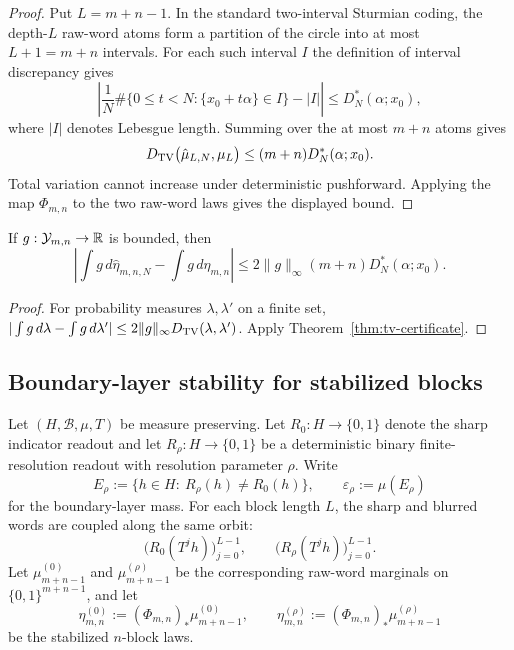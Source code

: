 \begin{proof}
Put $L=m+n-1$.  In the standard two-interval Sturmian coding, the depth-$L$
raw-word atoms form a partition of the circle into at most $L+1=m+n$
intervals.  For each such interval $I$ the definition of interval discrepancy
gives
\[
\left|
\frac1N\#\{0\le t<N:\{x_0+t\alpha\}\in I\}-|I|
\right|
\le D_N^*(\alpha;x_0),
\]
where $|I|$ denotes Lebesgue length.  Summing over the at most $m+n$ atoms gives
\[
D_{\mathrm{TV}}\bigl(\hat{\mu}_{L,N},\mu_L\bigr)
\le (m+n)D_N^*(\alpha;x_0).
\]
Total variation cannot increase under deterministic pushforward.  Applying
the map $\Phi_{m,n}$ to the two raw-word laws gives the displayed bound.
\end{proof}

\begin{corollary}\label{cor:observable-certificate}
If $g:\mathcal Y_{m,n}\to\mathbb{R}$ is bounded, then
\[
\left|
\int g\,d\hat{\eta}_{m,n,N}-\int g\,d\eta_{m,n}
\right|
\le
2\|g\|_\infty (m+n)D_N^*(\alpha;x_0).
\]
\end{corollary}

\begin{proof}
For probability measures $\lambda,\lambda'$ on a finite set,
$|\int g\,d\lambda-\int g\,d\lambda'|
\le 2\|g\|_\infty D_{\mathrm{TV}}(\lambda,\lambda')$.  Apply
Theorem~\ref{thm:tv-certificate}.
\end{proof}

\subsection{Boundary-layer stability for stabilized blocks}\label{sec:fp:tv:boundary}

Let $(H,\mathcal B,\mu,T)$ be measure preserving. Let
$R_0:H\to\{0,1\}$ denote the sharp indicator readout and let
$R_\rho:H\to\{0,1\}$ be a deterministic binary finite-resolution readout with
resolution parameter $\rho$. Write
\[
E_\rho:=\{h\in H:\ R_\rho(h)\neq R_0(h)\},
\qquad
\varepsilon_\rho
:=
\mu(E_\rho)
\]
for the boundary-layer mass. For each block length $L$, the sharp and blurred
words are coupled along the same orbit:
\[
\bigl(R_0(T^j h)\bigr)_{j=0}^{L-1},
\qquad
\bigl(R_\rho(T^j h)\bigr)_{j=0}^{L-1}.
\]
Let $\mu_{m+n-1}^{(0)}$ and $\mu_{m+n-1}^{(\rho)}$ be the corresponding
raw-word marginals on $\{0,1\}^{m+n-1}$, and let
\[
\eta_{m,n}^{(0)}:=(\Phi_{m,n})_*\mu_{m+n-1}^{(0)},
\qquad
\eta_{m,n}^{(\rho)}:=(\Phi_{m,n})_*\mu_{m+n-1}^{(\rho)}
\]
be the stabilized $n$-block laws.

